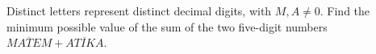 Distinct letters represent distinct decimal digits, with $M,A\ne0$. Find the minimum possible value of the sum of the two five-digit numbers $\overline{MATEM}+\overline{ATIKA}$.
